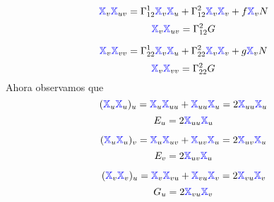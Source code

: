 \documentclass{article}
\newcommand{\bb}[1]{\mathbb{#1}}
\begin{document}
$$
\textcolor{blue}{\bb{X}}_v \textcolor{blue}{\bb{X}}_{uv} = \Gamma_{12}^1 \textcolor{blue}{\bb{X}}_v \textcolor{blue}{\bb{X}}_u + \Gamma_{12}^2 \textcolor{blue}{\bb{X}}_v\textcolor{blue}{\bb{X}}_v + f \textcolor{blue}{\bb{X}}_v N
$$
$$
\textcolor{blue}{\bb{X}}_v \textcolor{blue}{\bb{X}}_{uv} = \Gamma_{12}^2 G
$$

$$
\textcolor{blue}{\bb{X}}_v \textcolor{blue}{\bb{X}}_{vv} = \Gamma_{22}^1 \textcolor{blue}{\bb{X}}_v \textcolor{blue}{\bb{X}}_u + \Gamma_{22}^2 \textcolor{blue}{\bb{X}}_v\textcolor{blue}{\bb{X}}_v + g \textcolor{blue}{\bb{X}}_v N
$$
$$
\textcolor{blue}{\bb{X}}_v \textcolor{blue}{\bb{X}}_{vv} = \Gamma_{22}^2 G
$$
Ahora observamos que
$$
(\textcolor{blue}{\bb{X}}_u\textcolor{blue}{\bb{X}}_u)_u = \textcolor{blue}{\bb{X}}_u \textcolor{blue}{\bb{X}}_{uu} + \textcolor{blue}{\bb{X}}_{uu} \textcolor{blue}{\bb{X}}_u =
2 \textcolor{blue}{\bb{X}}_{uu}\textcolor{blue}{\bb{X}}_u
$$
$$
E_u = 2 \textcolor{blue}{\bb{X}}_{uu}\textcolor{blue}{\bb{X}}_u
$$

$$
(\textcolor{blue}{\bb{X}}_u\textcolor{blue}{\bb{X}}_u)_v = \textcolor{blue}{\bb{X}}_u \textcolor{blue}{\bb{X}}_{uv} + \textcolor{blue}{\bb{X}}_{uv} \textcolor{blue}{\bb{X}}_u =
2 \textcolor{blue}{\bb{X}}_{uv}\textcolor{blue}{\bb{X}}_u
$$
$$
E_v = 2 \textcolor{blue}{\bb{X}}_{uv}\textcolor{blue}{\bb{X}}_u
$$

$$
(\textcolor{blue}{\bb{X}}_v\textcolor{blue}{\bb{X}}_v)_u = \textcolor{blue}{\bb{X}}_v \textcolor{blue}{\bb{X}}_{vu} + \textcolor{blue}{\bb{X}}_{vu} \textcolor{blue}{\bb{X}}_v =
2 \textcolor{blue}{\bb{X}}_{vu}\textcolor{blue}{\bb{X}}_v
$$
$$
G_u = 2 \textcolor{blue}{\bb{X}}_{vu}\textcolor{blue}{\bb{X}}_v
$$
\end{document}
